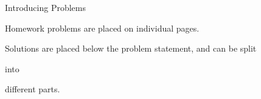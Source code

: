 


%
%

\newcommand{\hmwkTitle}{Title}
\newcommand{\hmwkSubTitle}{Subtitle}
\newcommand{\hmwkDueDate}{Due Date}
\newcommand{\hmwkDueTime}{11:59 PM}
\newcommand{\hmwkClass}{Course - Section}
\newcommand{\hmwkClassTime}{Time}
\newcommand{\hmwkClassInstructor}{Instuctor}
\newcommand{\hmwkAuthorName}{\textbf{Author}}
\newcommand{\hmwkCompletionDate}{\today}



\maketitle

\pagebreak

\begin{hwkProblem}{1}{Introducing Problems}

	Homework problems are placed on individual pages.

	\hwkSol{}

	Solutions are placed below the problem statement, and can be split

	\hwkPart{}

	into

	\hwkPart{}

	different parts.

\end{hwkProblem}

